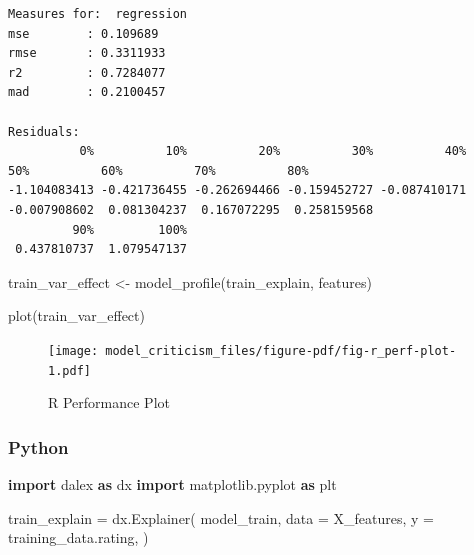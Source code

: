 \documentclass[
  letterpaper,
]{krantz}
\newenvironment{Shaded}{}{}
\newcommand{\FunctionTok}[1]{\textcolor[rgb]{0.02,0.16,0.49}{#1}}
\newcommand{\ImportTok}[1]{\textcolor[rgb]{0.00,0.50,0.00}{\textbf{#1}}}
\newcommand{\NormalTok}[1]{#1}
\newcommand{\OperatorTok}[1]{\textcolor[rgb]{0.40,0.40,0.40}{#1}}
\newcommand{\OtherTok}[1]{\textcolor[rgb]{0.00,0.44,0.13}{#1}}
\begin{document}
\begin{verbatim}
Measures for:  regression
mse        : 0.109689 
rmse       : 0.3311933 
r2         : 0.7284077 
mad        : 0.2100457

Residuals:
          0%          10%          20%          30%          40%          50%          60%          70%          80% 
-1.104083413 -0.421736455 -0.262694466 -0.159452727 -0.087410171 -0.007908602  0.081304237  0.167072295  0.258159568 
         90%         100% 
 0.437810737  1.079547137 
\end{verbatim}

\begin{Shaded}
\begin{Highlighting}[]
\NormalTok{train\_var\_effect }\OtherTok{\textless{}{-}} \FunctionTok{model\_profile}\NormalTok{(train\_explain, }
\NormalTok{                            features)}
\end{Highlighting}
\end{Shaded}

\begin{Shaded}
\begin{Highlighting}[]
\FunctionTok{plot}\NormalTok{(train\_var\_effect)}
\end{Highlighting}
\end{Shaded}

\begin{figure}[H]

{\centering \texttt{[image: model\_criticism\_files/figure-pdf/fig-r\_perf-plot-1.pdf]}

}

\caption{\label{fig-r_perf-plot}R Performance Plot}

\end{figure}

\subsubsection{Python}

\begin{Shaded}
\begin{Highlighting}[]
\ImportTok{import}\NormalTok{ dalex }\ImportTok{as}\NormalTok{ dx}
\ImportTok{import}\NormalTok{ matplotlib.pyplot }\ImportTok{as}\NormalTok{ plt}

\NormalTok{train\_explain }\OperatorTok{=}\NormalTok{ dx.Explainer(}
\NormalTok{    model\_train, }
\NormalTok{    data }\OperatorTok{=}\NormalTok{ X\_features, }
\NormalTok{    y }\OperatorTok{=}\NormalTok{ training\_data.rating,}
\NormalTok{)}
\end{Highlighting}
\end{Shaded}
\end{document}
